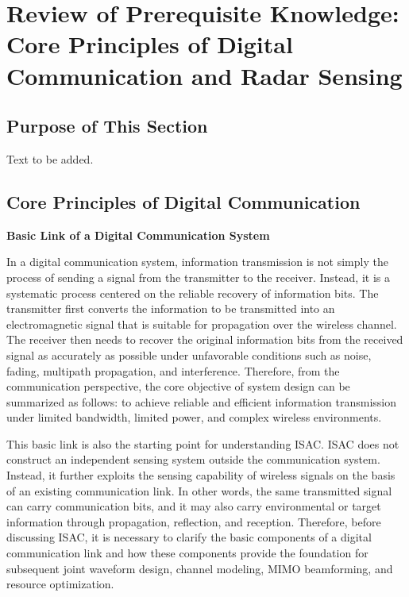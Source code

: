 
\section{Review of Prerequisite Knowledge: Core Principles of Digital Communication and Radar Sensing}
\label{sec:ch1-prerequisites}
 

\subsection{Purpose of This Section}
\label{subsec:ch1-prerequisites-purpose}


Text to be added.

\subsection{Core Principles of Digital Communication}
\label{subsec:ch1-digital-comm}


 
\noindent\textbf{Basic Link of a Digital Communication System}


In a digital communication system,
information transmission is not simply the process of sending a signal from the transmitter to the receiver.
Instead,
it is a systematic process centered on the reliable recovery of information bits.
The transmitter first converts the information to be transmitted into an electromagnetic signal
that is suitable for propagation over the wireless channel.
The receiver then needs to recover the original information bits from the received signal
as accurately as possible under unfavorable conditions such as noise,
fading,
multipath propagation,
and interference.
Therefore,
from the communication perspective,
the core objective of system design can be summarized as follows:
to achieve reliable and efficient information transmission under limited bandwidth,
limited power,
and complex wireless environments.

This basic link is also the starting point for understanding ISAC.
ISAC does not construct an independent sensing system outside the communication system.
Instead,
it further exploits the sensing capability of wireless signals on the basis of an existing communication link.
In other words,
the same transmitted signal can carry communication bits,
and it may also carry environmental or target information through propagation,
reflection,
and reception.
Therefore,
before discussing ISAC,
it is necessary to clarify the basic components of a digital communication link
and how these components provide the foundation for subsequent joint waveform design,
channel modeling,
MIMO beamforming,
and resource optimization.

